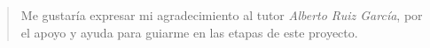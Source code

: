 
\pagestyle{empty}

 

\vspace*{\fill}
\thispagestyle{empty}
\begin{quotation}
	\em 
	\begin{flushright}
		Me gustaría expresar mi agradecimiento al tutor \textit{Alberto Ruiz García}, por el apoyo y ayuda para guiarme en las etapas de este proyecto.
	\end{flushright}
	\medskip
	\raggedleft
\end{quotation}
\vspace*{\fill}